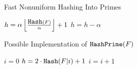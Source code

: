 \documentclass[11pt]{llncs}
\begin{document}
\begin{algorithm}
  \caption{Fast Nonuniform Hashing Into Primes}
  \label{alg:scanprime}
  \begin{algorithmic}[1]
  \State $h =\alpha \left\lfloor\frac{\mbox{{\tt Hash}}(F)}{\alpha}\right\rfloor+1$
\State $h = h-\alpha$
\EndWhile
\State {}
  \end{algorithmic}
\end{algorithm} 

\begin{algorithm}
  \caption{Possible Implementation of $\mbox{{\tt HashPrime}}(F)$}
  \label{alg:primes}
  \begin{algorithmic}[1]
  \State $i=0$
\Repeat
\State $h = 2\cdot\mbox{{\tt Hash}}(F|i)+1$
\State $i = i+1$
\State {}
  \end{algorithmic}
\end{algorithm}
\end{document}
